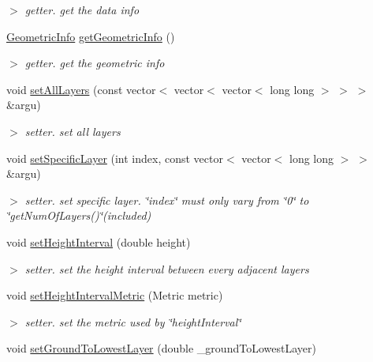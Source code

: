 \begin{DoxyCompactItemize}
\begin{DoxyCompactList}\small\item\em $>$ getter. get the data info \end{DoxyCompactList}\item 
\hypertarget{classGridLayer_a3d576c2329066b7aaabfaaffdb2b1f54}{\hyperlink{structGeometricInfo}{\-Geometric\-Info} \hyperlink{classGridLayer_a3d576c2329066b7aaabfaaffdb2b1f54}{get\-Geometric\-Info} ()}\label{classGridLayer_a3d576c2329066b7aaabfaaffdb2b1f54}

\begin{DoxyCompactList}\small\item\em $>$ getter. get the geometric info \end{DoxyCompactList}\item 
void \hyperlink{classGridLayer_a7c76d709457ea5bf6d87f1d9f4bfa95a}{set\-All\-Layers} (const vector$<$ vector$<$ vector$<$ long long $>$ $>$ $>$ \&argu)
\begin{DoxyCompactList}\small\item\em $>$ setter. set all layers \end{DoxyCompactList}\item 
void \hyperlink{classGridLayer_a7f5c9e2435213374d1a406b825f18726}{set\-Specific\-Layer} (int index, const vector$<$ vector$<$ long long $>$ $>$ \&argu)
\begin{DoxyCompactList}\small\item\em $>$ setter. set specific layer. \char`\"{}index\char`\"{} must only vary from \char`\"{}0\char`\"{} to \char`\"{}get\-Num\-Of\-Layers()\char`\"{}(included) \end{DoxyCompactList}\item 
void \hyperlink{classGridLayer_a8d94cee990ba0d799d17f26501bdc473}{set\-Height\-Interval} (double height)
\begin{DoxyCompactList}\small\item\em $>$ setter. set the height interval between every adjacent layers \end{DoxyCompactList}\item 
\hypertarget{classGridLayer_a2e9aca476dadc47333e26e2f036e1932}{void \hyperlink{classGridLayer_a2e9aca476dadc47333e26e2f036e1932}{set\-Height\-Interval\-Metric} (\-Metric metric)}\label{classGridLayer_a2e9aca476dadc47333e26e2f036e1932}

\begin{DoxyCompactList}\small\item\em $>$ setter. set the metric used by \char`\"{}height\-Interval\char`\"{} \end{DoxyCompactList}\item 
\hypertarget{classGridLayer_a63520a28c62328e6bc30c0d98d8f54da}{void \hyperlink{classGridLayer_a63520a28c62328e6bc30c0d98d8f54da}{set\-Ground\-To\-Lowest\-Layer} (double \-\_\-ground\-To\-Lowest\-Layer)}\label{classGridLayer_a63520a28c62328e6bc30c0d98d8f54da}


\end{DoxyCompactItemize}

